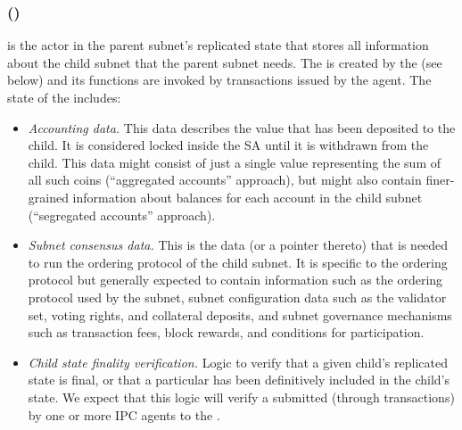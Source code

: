 \subsubsection{\saFull (\sa)}
    \sa is the actor in the parent subnet's replicated state
    that stores all information about the child subnet that the parent subnet needs.
    The \sa is created by the \gw (see below) and its functions are invoked by transactions issued by the \ipc agent.
    The state of the \sa includes:
    \begin{itemize}

        \item \emph{Accounting data.}
        This data describes the value that has been deposited to the child.
        It is considered locked inside the SA until it is withdrawn from the child.
        This data might consist of just a single value representing the sum of all such coins (``aggregated accounts'' approach), 
        but might also contain finer-grained information about balances for each account in the child subnet (``segregated accounts'' approach).

        \item \emph{Subnet consensus data.}
        This is the data (or a pointer thereto) that is needed to run the ordering protocol of the child subnet.
        It is specific to the ordering protocol but generally expected to contain information such as the ordering protocol used by the subnet, subnet configuration data such as the validator set, voting rights, and collateral deposits, and subnet governance mechanisms such as transaction fees, block rewards, and conditions for participation.         

        \item \emph{Child state finality verification.} Logic to verify that a given child's replicated state is final,
        or that a particular \tx has been definitively included in the child's state.
        We expect that this logic will verify a \pof submitted (through transactions) by one or more IPC agents to the \sa.
          

\end{itemize}
